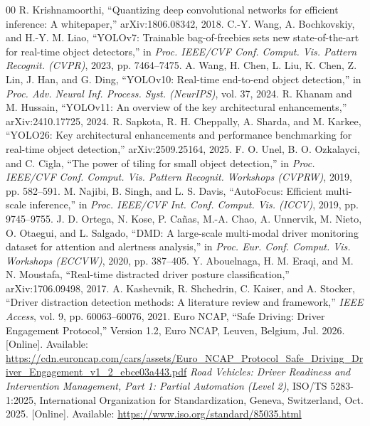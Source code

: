 \documentclass[conference]{IEEEtran}
\begin{document}
\begin{thebibliography}{00}
 R. Krishnamoorthi, ``Quantizing deep convolutional networks for efficient inference: A whitepaper,'' arXiv:1806.08342, 2018.
 C.-Y. Wang, A. Bochkovskiy, and H.-Y. M. Liao, ``YOLOv7: Trainable bag-of-freebies sets new state-of-the-art for real-time object detectors,'' in \emph{Proc. IEEE/CVF Conf. Comput. Vis. Pattern Recognit. (CVPR)}, 2023, pp. 7464--7475.
 A. Wang, H. Chen, L. Liu, K. Chen, Z. Lin, J. Han, and G. Ding, ``YOLOv10: Real-time end-to-end object detection,'' in \emph{Proc. Adv. Neural Inf. Process. Syst. (NeurIPS)}, vol. 37, 2024.
 R. Khanam and M. Hussain, ``YOLOv11: An overview of the key architectural enhancements,'' arXiv:2410.17725, 2024.
 R. Sapkota, R. H. Cheppally, A. Sharda, and M. Karkee, ``YOLO26: Key architectural enhancements and performance benchmarking for real-time object detection,'' arXiv:2509.25164, 2025.
 F. O. Unel, B. O. Ozkalayci, and C. Cigla, ``The power of tiling for small object detection,'' in \emph{Proc. IEEE/CVF Conf. Comput. Vis. Pattern Recognit. Workshops (CVPRW)}, 2019, pp. 582--591.
 M. Najibi, B. Singh, and L. S. Davis, ``AutoFocus: Efficient multi-scale inference,'' in \emph{Proc. IEEE/CVF Int. Conf. Comput. Vis. (ICCV)}, 2019, pp. 9745--9755.
 J. D. Ortega, N. Kose, P. Ca\~{n}as, M.-A. Chao, A. Unnervik, M. Nieto, O. Otaegui, and L. Salgado, ``DMD: A large-scale multi-modal driver monitoring dataset for attention and alertness analysis,'' in \emph{Proc. Eur. Conf. Comput. Vis. Workshops (ECCVW)}, 2020, pp. 387--405.
 Y. Abouelnaga, H. M. Eraqi, and M. N. Moustafa, ``Real-time distracted driver posture classification,'' arXiv:1706.09498, 2017.
 A. Kashevnik, R. Shchedrin, C. Kaiser, and A. Stocker, ``Driver distraction detection methods: A literature review and framework,'' \emph{IEEE Access}, vol. 9, pp. 60063--60076, 2021.
 Euro NCAP, ``Safe Driving: Driver Engagement Protocol,'' Version 1.2, Euro NCAP, Leuven, Belgium, Jul. 2026. [Online]. Available: \url{https://cdn.euroncap.com/cars/assets/Euro_NCAP_Protocol_Safe_Driving_Driver_Engagement_v1_2_ebce03a443.pdf}
 \textit{Road Vehicles: Driver Readiness and Intervention Management, Part 1: Partial Automation (Level 2)}, ISO/TS 5283-1:2025, International Organization for Standardization, Geneva, Switzerland, Oct. 2025. [Online]. Available: \url{https://www.iso.org/standard/85035.html}
\end{thebibliography}
\end{document}
